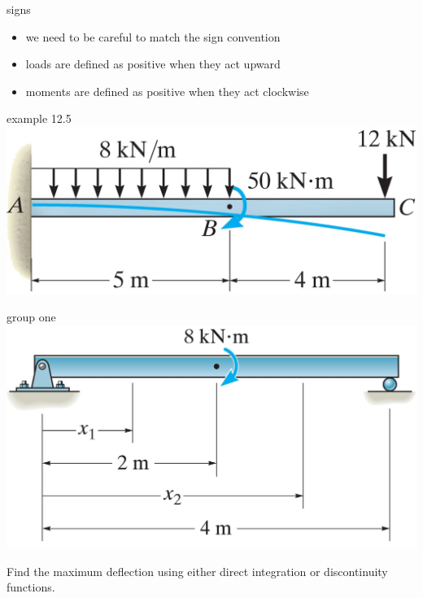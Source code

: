 \documentclass[
  letterpaper,
  ignorenonframetext,
  aspectratio=43,
  handout,
  12pt]{beamer}
\providecommand{\tightlist}{%
  \setlength{\itemsep}{0pt}\setlength{\parskip}{0pt}}
\providecommand{\tightlist}{%
\setlength{\itemsep}{0pt}\setlength{\parskip}{0pt}}
\let\Oldincludegraphics\includegraphics
\renewcommand{\includegraphics}[2][]{\Oldincludegraphics[width=\textwidth,height=0.7\textheight,keepaspectratio]{#2}}
\begin{document}
\begin{frame}{signs}
\protect\hypertarget{signs}{}
\begin{itemize}
\tightlist
\item
  we need to be careful to match the sign convention
\item
  loads are defined as positive when they act upward
\item
  moments are defined as positive when they act clockwise
\end{itemize}
\end{frame}

\begin{frame}{example 12.5}
\protect\hypertarget{example-12.5}{}
\includegraphics{../images/example-12-5.jpg}
\end{frame}

\begin{frame}{group one}
\protect\hypertarget{group-one}{}
\includegraphics{../images/group-12-1.jpg}

Find the maximum deflection using either direct integration or
discontinuity functions.
\end{frame}
\end{document}
